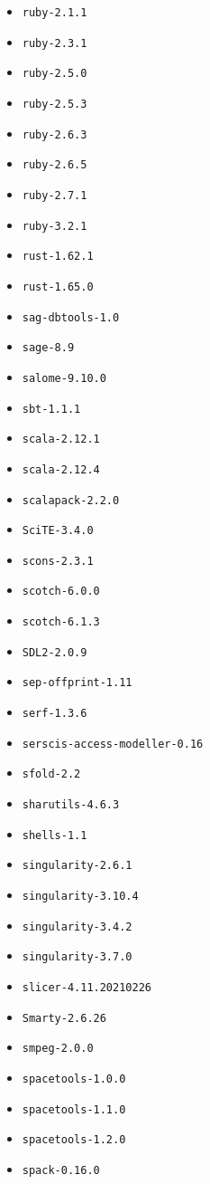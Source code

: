 \begin{multicols}{3}
\begin{itemize}
\item \verb|ruby-2.1.1|
\item \verb|ruby-2.3.1|
\item \verb|ruby-2.5.0|
\item \verb|ruby-2.5.3|
\item \verb|ruby-2.6.3|
\item \verb|ruby-2.6.5|
\item \verb|ruby-2.7.1|
\item \verb|ruby-3.2.1|
\item \verb|rust-1.62.1|
\item \verb|rust-1.65.0|
\item \verb|sag-dbtools-1.0|
\item \verb|sage-8.9|
\item \verb|salome-9.10.0|
\item \verb|sbt-1.1.1|
\item \verb|scala-2.12.1|
\item \verb|scala-2.12.4|
\item \verb|scalapack-2.2.0|
\item \verb|SciTE-3.4.0|
\item \verb|scons-2.3.1|
\item \verb|scotch-6.0.0|
\item \verb|scotch-6.1.3|
\item \verb|SDL2-2.0.9|
\item \verb|sep-offprint-1.11|
\item \verb|serf-1.3.6|
\item \verb|serscis-access-modeller-0.16|
\item \verb|sfold-2.2|
\item \verb|sharutils-4.6.3|
\item \verb|shells-1.1|
\item \verb|singularity-2.6.1|
\item \verb|singularity-3.10.4|
\item \verb|singularity-3.4.2|
\item \verb|singularity-3.7.0|
\item \verb|slicer-4.11.20210226|
\item \verb|Smarty-2.6.26|
\item \verb|smpeg-2.0.0|
\item \verb|spacetools-1.0.0|
\item \verb|spacetools-1.1.0|
\item \verb|spacetools-1.2.0|
\item \verb|spack-0.16.0|

\end{itemize}
\end{multicols}
